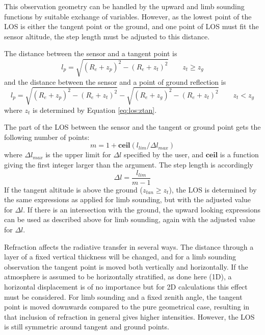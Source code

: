   \label{sec:los:down}
  
  This observation geometry can be handled by the upward and limb
  sounding functions by suitable exchange of variables. However, as
  the lowest point of the LOS is either the tangent point or the
  ground, and one point of LOS must fit the sensor altitude, the step
  length must be adjusted to this distance.

  The distance between the sensor and a tangent point is
  \begin{equation}
    l_p = \sqrt{ (R_e+z_p)^2 - (R_e+z_t)^2 } \qquad  z_t \geq z_g
  \end{equation}
  and the distance between the sensor and a point of ground
  reflection is
  \begin{equation}
    l_p = \sqrt{ (R_e+z_p)^2 - (R_e+z_t)^2 } - \sqrt{ (R_e+z_g)^2-(R_e+z_t)^2}
            \qquad z_t < z_g
  \end{equation}
  where $z_t$ is determined by Equation \ref{eq:los:ztan}.

 The part of the LOS between the sensor and the tangent or ground
 point gets the following number of points:
 \begin{equation}
    m = 1 + \mathbf{ ceil}(l_{lim}/\Delta l_{max})
  \label{eq:los:m}
 \end{equation}
 where $\Delta l_{max}$ is the upper limit for $\Delta l$ specified by
 the user, and $\mathbf{ ceil}$ is a function giving the first integer
 larger than the argument. The step length is accordingly
 \begin{equation}
    \Delta l = \frac{l_{lim}}{m-1}
  \label{eq:los:dl}
 \end{equation} 
 If the tangent altitude is above the ground ($z_{tan} \geq z_t$),
 the LOS is determined by the same expressions as applied for limb
 sounding, but with the adjusted value for $\Delta l$.
 If there is an intersection with the ground, the upward
 looking expressions can be used as described above for limb sounding,
 again with the adjusted value for $\Delta l$.


  \label{sec:los:refraction}
  
  Refraction affects the radiative transfer in several ways. The
  distance through a layer of a fixed vertical thickness will be
  changed, and for a limb sounding observation the tangent point is
  moved both vertically and horizontally. If the atmosphere is assumed
  to be horizontally stratified, as done here (1D), a horizontal
  displacement is of no importance but for 2D calculations this effect
  must be considered. For limb sounding and a fixed zenith angle, the
  tangent point is moved downwards compared to the pure geometrical
  case, resulting in that inclusion of refraction in general gives
  higher intensities. However, the LOS is still symmetric around
  tangent and ground points.

